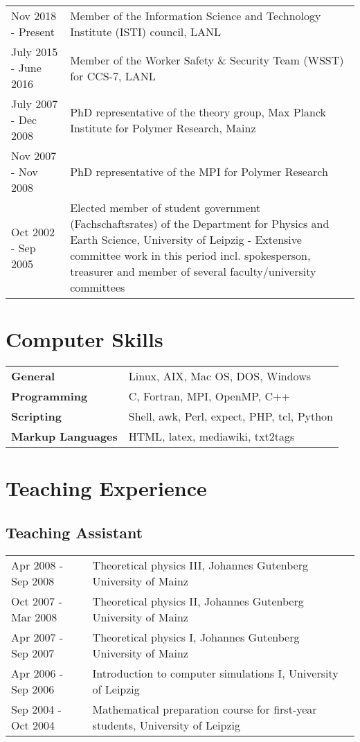 \documentclass{article}
\begin{document}
\begin{tabular}{p{}p{}}
Nov 2018 - Present & Member of the Information Science and Technology Institute (ISTI) council, LANL \\ 
July 2015 - June 2016 & Member of the Worker Safety \& Security Team (WSST) for CCS-7, LANL \\
July 2007 - Dec 2008 & PhD representative of the theory group, Max Planck Institute for Polymer Research, Mainz \\
Nov 2007 - Nov 2008 & PhD representative of the MPI for Polymer Research \\
Oct 2002 - Sep 2005 & Elected member of student government (Fachschaftsrates) of the Department for Physics and Earth Science, University of Leipzig - Extensive committee work in this period incl. spokesperson, treasurer and member of several faculty/university committees \\
\end{tabular}


\section*{Computer Skills}

\begin{tabular}{ll}
\textbf{General} & Linux, AIX, Mac OS, DOS, Windows \\
\textbf{Programming} & C, Fortran, MPI, OpenMP, C++ \\
\textbf{Scripting} & Shell, awk, Perl, expect, PHP, tcl, Python\\
\textbf{Markup Languages} & HTML, latex, mediawiki, txt2tags \\
\end{tabular}

\section*{Teaching Experience}

\vspace{-2mm}
\subsection*{Teaching Assistant}

\begin{tabular}{p{}p{}}
Apr 2008 - Sep 2008 & Theoretical physics III, Johannes Gutenberg University of Mainz \\
Oct 2007 - Mar 2008 & Theoretical physics II, Johannes Gutenberg University of Mainz \\
Apr 2007 - Sep 2007 & Theoretical physics I, Johannes Gutenberg University of Mainz \\
Apr 2006 - Sep 2006 & Introduction to computer simulations I, University of Leipzig \\
Sep 2004 - Oct 2004 & Mathematical preparation course for first-year students, University of Leipzig \\
\end{tabular}
\end{document}
